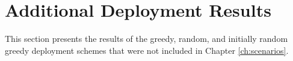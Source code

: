 \chapter{Additional Deployment Results}
\label{ch:additional_results}

This section presents the results of the greedy, random, and initially random greedy deployment schemes that were not included in Chapter \ref{ch:scenarios}.